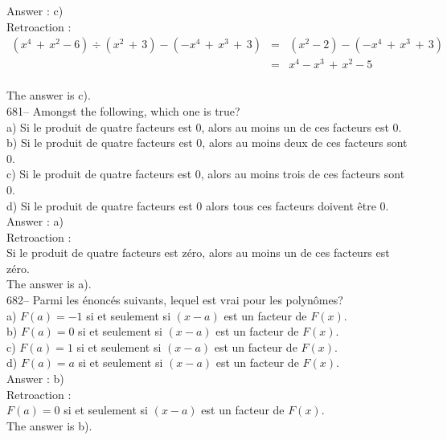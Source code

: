 ﻿\documentclass[letterpaper, 12pt]{article}
\begin{document}
Answer : c)\\

Retroaction :\\
\begin{eqnarray*}
\left( x^{4}\,+\,x^{2}-6\right) \div\left( x^{2}\,+\,3\right) -\left(
-x^{4}\,+\,x^{3}\,+\,3\right)&=&\left( x^{2}-2\right)-\left(
-x^{4}\,+\,x^{3}\,+\,3\right)\\[1mm]
&=&x^{4}-x^{3}\,+\,x^{2}-5\\[1mm]
\end{eqnarray*}

The answer is c).\\

681-- Amongst the following, which one is true?\\
a) Si le produit de quatre facteurs est 0, alors au moins un de ces facteurs
est 0.  \\
b) Si le produit de quatre facteurs est 0, alors au moins deux de ces
facteurs sont 0.  \\
c) Si le produit de quatre facteurs est 0, alors au moins trois de ces
facteurs sont 0.  \\
d) Si le produit de quatre facteurs est 0 alors tous ces facteurs doivent
\^etre 0.\\

Answer : a)\\

Retroaction : \\
Si le produit de quatre facteurs est z\'ero, alors au moins un de ces
facteurs est z\'ero.  \\
The answer is a).\\

682-- Parmi les \'enonc\'es suivants, lequel est vrai pour les polyn\^omes?\\
a)  $F\left( a\right) = -1$ si et seulement si $\left( x-a\right) $
est un
facteur de $F\left( x\right) $.\\
b) $ F\left( a\right) = 0 $ si et seulement si $ \left( x-a\right) $
est un facteur
de $F\left( x\right) $.\\
c) $ F\left( a\right) = 1 $ si et seulement si $ \left( x-a\right) $
est un facteur
de $F\left( x\right) $.\\
d) $ F\left( a\right) = a $ si et seulement si $ \left( x-a\right) $
est un facteur
de $F\left( x\right) $.\\

Answer : b)\\

Retroaction : \\
$ F\left( a\right) = 0 $ si et seulement si $ \left( x-a\right) $
est un facteur de
$F\left( x\right) $.\\
The answer is b).\\
\end{document}
